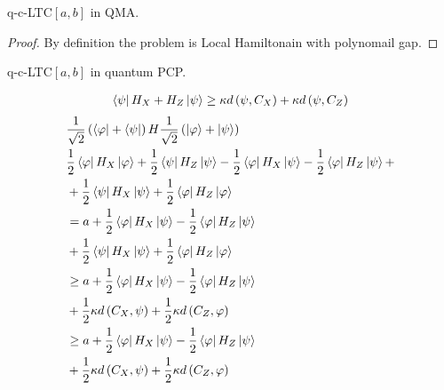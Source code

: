 \documentclass[manuscript,screen,review]{acmart}
\begin{document}
\begin{claim}
 q-c-LTC$[a,b]$ in QMA. 
\end{claim}
\begin{proof}
  By definition the problem is Local Hamiltonain with polynomail gap.%
\end{proof}

\begin{claim} 
 q-c-LTC$[a,b]$ in quantum PCP.  
\end{claim}


   


\begin{equation*}
  \begin{split}
    \bra{\psi} H_{X} + H_{Z} \ket{\psi} \ge \kappa d\left( \psi, C_{X} \right) + \kappa d\left( \psi, C_{Z} \right)
  \end{split}
\end{equation*}
\begin{equation*}
  \begin{split}
    & \frac{1}{\sqrt{2}}\left( \bra{ \varphi} + \bra{\psi} \right) H \frac{1}{\sqrt{2}}\left( \ket{ \varphi} + \ket{\psi} \right) \\ 
    & \frac{1}{2} \bra{ \varphi}H_{X} \ket{\varphi} + \frac{1}{2}\bra{\psi}H_{Z} \ket{\psi} -   \frac{1}{2}\bra{\varphi}H_{X}\ket{\psi} - \frac{1}{2}\bra{\varphi}H_{Z}\ket{\psi} + \\
    & +  \frac{1}{2} \bra{ \psi}H_{X} \ket{\psi} + \frac{1}{2}\bra{\varphi}H_{Z} \ket{\varphi} \\
& = a +  \frac{1}{2}\bra{\varphi}H_{X}\ket{\psi} - \frac{1}{2}\bra{\varphi}H_{Z}\ket{\psi} \\
    & +  \frac{1}{2} \bra{ \psi}H_{X} \ket{\psi} + \frac{1}{2}\bra{\varphi}H_{Z} \ket{\varphi} \\
& \ge a +  \frac{1}{2}\bra{\varphi}H_{X}\ket{\psi} - \frac{1}{2}\bra{\varphi}H_{Z}\ket{\psi} \\
& +  \frac{1}{2}\kappa d\left( C_{X}, \psi \right) + \frac{1}{2}\kappa d\left( C_{Z}, \varphi \right) \\
& \ge a +  \frac{1}{2}\bra{\varphi}H_{X}\ket{\psi} - \frac{1}{2}\bra{\varphi}H_{Z}\ket{\psi} \\
& +  \frac{1}{2}\kappa d\left( C_{X}, \psi \right) + \frac{1}{2}\kappa d\left( C_{Z}, \varphi \right) 
  \end{split}
\end{equation*}
\end{document}
